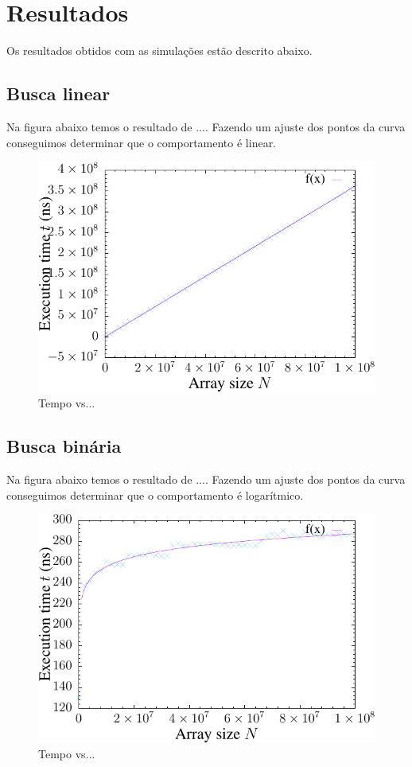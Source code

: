 \chapter{Resultados}

Os resultados obtidos com as simulações estão descrito abaixo.

\section{Busca linear}

Na figura abaixo temos o resultado de .... Fazendo um ajuste dos pontos da curva conseguimos determinar que o comportamento é linear.


\begin{figure}[H]
  \centering
  \includegraphics[scale=1.2]{../plots/lsearch_time.pdf}
  \caption{Tempo vs...}
\end{figure} \label{fig:lseach_time}


\section{Busca binária}

Na figura abaixo temos o resultado de .... Fazendo um ajuste dos pontos da curva conseguimos determinar que o comportamento é logarítmico.


\begin{figure}[H]
  \centering
  \includegraphics[scale=1.2]{../plots/bsearch_it_time.pdf}
  \caption{Tempo vs...}
\end{figure} \label{fig:bseach_it_time}

